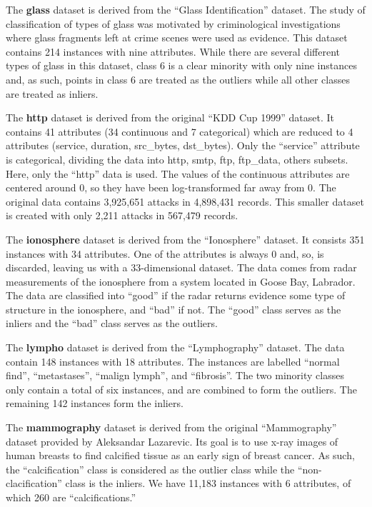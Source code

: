 The \textbf{glass} dataset is derived from the ``Glass Identification'' dataset.
The study of classification of types of glass was motivated by criminological investigations where glass fragments left at crime scenes were used as evidence.
This dataset contains 214 instances with nine attributes.
While there are several different types of glass in this dataset, class 6 is a clear minority with only nine instances and, as such, points in class 6 are treated as the outliers while all other classes are treated as inliers.

The \textbf{http} dataset is derived from the original ``KDD Cup 1999'' dataset.
It contains 41 attributes (34 continuous and 7 categorical) which are reduced to 4 attributes (service, duration, src\_bytes, dst\_bytes).
Only the ``service'' attribute is categorical, dividing the data into {http, smtp, ftp, ftp\_data, others} subsets.
Here, only the ``http'' data is used.
The values of the continuous attributes are centered around 0, so they have been log-transformed far away from 0.
The original data contains 3,925,651 attacks in 4,898,431 records.
This smaller dataset is created with only 2,211 attacks in 567,479 records.

The \textbf{ionosphere} dataset is derived from the ``Ionosphere'' dataset.
It consists 351 instances with 34 attributes.
One of the attributes is always 0 and, so, is discarded, leaving us with a 33-dimensional dataset.
The data comes from radar measurements of the ionosphere from a system located in Goose Bay, Labrador.
The data are classified into ``good'' if the radar returns evidence some type of structure in the ionosphere, and ``bad'' if not.
The ``good'' class serves as the inliers and the ``bad'' class serves as the outliers.

The \textbf{lympho} dataset is derived from the ``Lymphography'' dataset.
The data contain 148 instances with 18 attributes.
The instances are labelled ``normal find'', ``metastases'', ``malign lymph'', and ``fibrosis''.
The two minority classes only contain a total of six instances, and are combined to form the outliers.
The remaining 142 instances form the inliers.

The \textbf{mammography} dataset is derived from the original ``Mammography'' dataset provided by Aleksandar Lazarevic.
Its goal is to use x-ray images of human breasts to find calcified tissue as an early sign of breast cancer.
As such, the ``calcification'' class is considered as the outlier class while the ``non-clacification'' class is the inliers.
We have 11,183 instances with 6 attributes, of which 260 are ``calcifications.''

